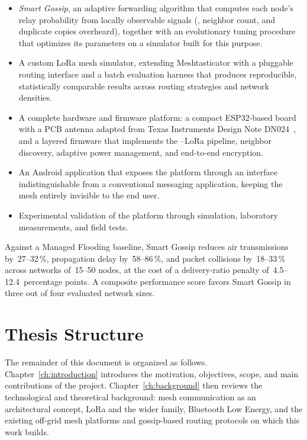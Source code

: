 \documentclass[english,bachelor]{tfgitic}[2026/01/22]
\begin{document}
\begin{itemize}
\item \emph{Smart Gossip}, an adaptive forwarding algorithm that computes each node's relay probability from locally observable signals (, neighbor count, and duplicate copies overheard), together with an evolutionary tuning procedure~\cite{eiben_2003} that optimizes its parameters on a simulator built for this purpose.

\item A custom LoRa mesh simulator, extending Meshtasticator with a pluggable routing interface and a batch evaluation harness that produces reproducible, statistically comparable results across routing strategies and network densities.

\item A complete hardware and firmware platform: a compact ESP32-based board with a PCB antenna adapted from Texas Instruments Design Note DN024~\cite{ti_dn024}, and a layered firmware that implements the --LoRa pipeline, neighbor discovery, adaptive power management, and end-to-end encryption.

\item An Android application that exposes the platform through an interface indistinguishable from a conventional messaging application, keeping the mesh entirely invisible to the end user.

\item Experimental validation of the platform through simulation, laboratory measurements, and field tests.
\end{itemize}

Against a Managed Flooding baseline, Smart Gossip reduces air transmissions by~27--32\,\%, propagation delay by~58--86\,\%, and packet collisions by~18--33\,\% across networks of~15--50 nodes, at the cost of a delivery-ratio penalty of~4.5--12.4~percentage points. A composite performance score favors Smart Gossip in three out of four evaluated network sizes.

\section{Thesis Structure}

The remainder of this document is organized as follows. Chapter~\ref{ch:introduction} introduces the motivation, objectives, scope, and main contributions of the project. Chapter~\ref{ch:background} then reviews the technological and theoretical background: mesh communication as an architectural concept, LoRa and the wider  family, Bluetooth Low Energy, and the existing off-grid mesh platforms and gossip-based routing protocols on which this work builds.
\end{document}
